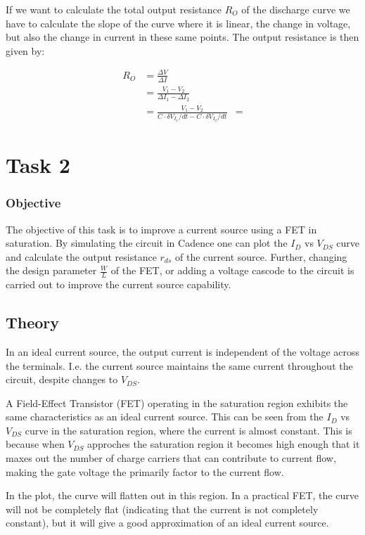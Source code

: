 \documentclass[onecolumn]{article}
\begin{document}
If we want to calculate the total output resistance $R_O$ of the discharge curve we have to calculate the slope of the curve where it is linear, the change in voltage, but also the change in current in these same points. The output resistance is then given by: 

\begin{align}
    R_O &= \frac{\Delta V}{\Delta I} \\
        &= \frac{V_1 - V_2}{\Delta I_1 - \Delta I_2}\\
        &= \frac{V_1 - V_2}{C \cdot \delta V_{I_1}/dt - C \cdot \delta V_{I_2}/dt}
        &=
\end{align}


\clearpage

\section{Task 2}

\subsubsection{Objective}
The objective of this task is to improve a current source using a FET in saturation. By simulating the circuit in Cadence one can plot the $I_D$ vs $V_{DS}$ curve and calculate the output resistance $r_{ds}$ of the current source. Further, changing the design parameter $\frac{W}{L}$ of the FET, or adding a voltage cascode to the circuit is carried out to improve the current source capability.

\subsection{Theory}

In an ideal current source, the output current is independent of the voltage across the terminals. I.e. the current source maintains the same current throughout the circuit, despite changes to $V_{DS}$.

A Field-Effect Transistor (FET) operating in the saturation region exhibits the same characteristics as an ideal current source. This can be seen from the $I_D$ vs $V_{DS}$ curve in the saturation region, where the current is almost constant. This is because when  $V_{DS}$ approches the saturation region it becomes high enough that it maxes out the number of charge carriers that can contribute to current flow, making the gate voltage the primarily factor to the current flow.

In the plot, the curve will flatten out in this region. In a practical FET, the curve will not be completely flat (indicating that the current is not completely constant), but it will give a good approximation of an ideal current source.
\end{document}
